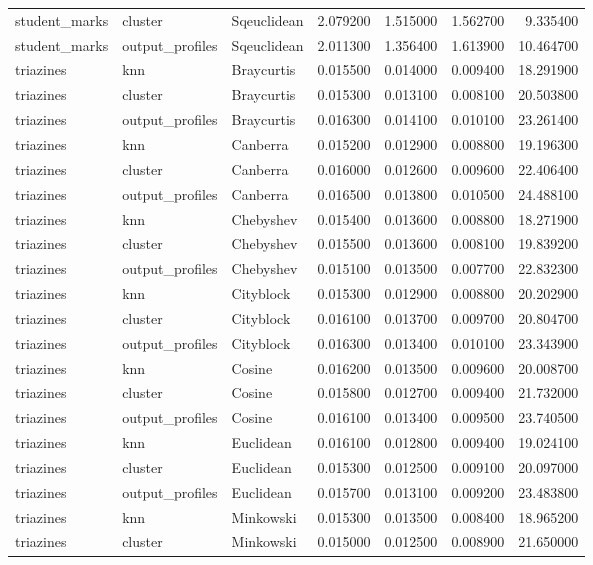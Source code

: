 \begin{tabular}{lllrrrr}
student\_marks & cluster & Sqeuclidean & 2.079200 & 1.515000 & 1.562700 & 9.335400 \\
student\_marks & output\_profiles & Sqeuclidean & 2.011300 & 1.356400 & 1.613900 & 10.464700 \\
triazines & knn & Braycurtis & 0.015500 & 0.014000 & 0.009400 & 18.291900 \\
triazines & cluster & Braycurtis & 0.015300 & 0.013100 & 0.008100 & 20.503800 \\
triazines & output\_profiles & Braycurtis & 0.016300 & 0.014100 & 0.010100 & 23.261400 \\
triazines & knn & Canberra & 0.015200 & 0.012900 & 0.008800 & 19.196300 \\
triazines & cluster & Canberra & 0.016000 & 0.012600 & 0.009600 & 22.406400 \\
triazines & output\_profiles & Canberra & 0.016500 & 0.013800 & 0.010500 & 24.488100 \\
triazines & knn & Chebyshev & 0.015400 & 0.013600 & 0.008800 & 18.271900 \\
triazines & cluster & Chebyshev & 0.015500 & 0.013600 & 0.008100 & 19.839200 \\
triazines & output\_profiles & Chebyshev & 0.015100 & 0.013500 & 0.007700 & 22.832300 \\
triazines & knn & Cityblock & 0.015300 & 0.012900 & 0.008800 & 20.202900 \\
triazines & cluster & Cityblock & 0.016100 & 0.013700 & 0.009700 & 20.804700 \\
triazines & output\_profiles & Cityblock & 0.016300 & 0.013400 & 0.010100 & 23.343900 \\
triazines & knn & Cosine & 0.016200 & 0.013500 & 0.009600 & 20.008700 \\
triazines & cluster & Cosine & 0.015800 & 0.012700 & 0.009400 & 21.732000 \\
triazines & output\_profiles & Cosine & 0.016100 & 0.013400 & 0.009500 & 23.740500 \\
triazines & knn & Euclidean & 0.016100 & 0.012800 & 0.009400 & 19.024100 \\
triazines & cluster & Euclidean & 0.015300 & 0.012500 & 0.009100 & 20.097000 \\
triazines & output\_profiles & Euclidean & 0.015700 & 0.013100 & 0.009200 & 23.483800 \\
triazines & knn & Minkowski & 0.015300 & 0.013500 & 0.008400 & 18.965200 \\
triazines & cluster & Minkowski & 0.015000 & 0.012500 & 0.008900 & 21.650000 \\

\end{tabular}
